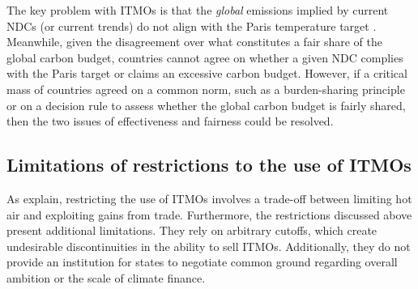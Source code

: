 \documentclass[12pt,english]{article}
\begin{document}

The key problem with ITMOs is that the \textit{global} emissions implied by current NDCs (or current trends) do not align with the Paris temperature target \citep{unep_emissions_2025,rogelj_credibility_2023}. 
Meanwhile, given the disagreement over what constitutes a fair share of the global carbon budget, countries cannot agree on whether a given NDC complies with the Paris target or %
claims an excessive carbon budget. However, if a critical mass of countries agreed on a common norm, such as a burden-sharing principle or on a decision rule to assess whether the global carbon budget is fairly shared, then the two issues of effectiveness %
and fairness could be resolved. 

\subsection{Limitations of restrictions to the use of ITMOs}
As \cite{mehling_governing_2019} explain, restricting the use of ITMOs involves a trade-off between limiting hot air and exploiting gains from trade. Furthermore, the restrictions discussed above present additional limitations. They rely on arbitrary cutoffs, which create undesirable discontinuities in the ability to sell ITMOs. Additionally, they do not provide an institution for states to negotiate %
common ground regarding overall ambition or the scale of climate finance. 
\end{document}
